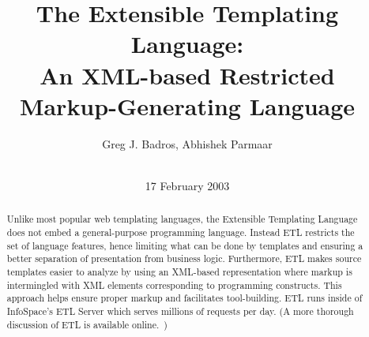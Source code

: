 \documentclass{www2003-submission}
\newcommand{\etl}{ETL}
\begin{document}
%
\title{The Extensible Templating Language: \\
       An XML-based Restricted Markup-Generating Language\vspace*{-.2in}}


\author{
%
\alignauthor Greg J. Badros, Abhishek Parmaar\\
       \\
       }

\date{17 February 2003}
\maketitle
\vspace*{-.7in}
\begin{abstract}
{ \small Unlike most popular web templating languages, the Extensible
Templating Language does not embed a general-purpose programming
language. Instead \etl{} restricts the set of language features, hence
limiting what can be done by templates and ensuring a better
separation of presentation from business logic. Furthermore,
\etl{} makes source templates easier to analyze by using an
XML-based representation where markup is intermingled with XML
elements corresponding to programming constructs. This approach helps
ensure proper markup and facilitates tool-building. \etl{} runs inside
of InfoSpace's ETL Server which serves millions of requests per
day. (A more thorough discussion of ETL is available
online.~\cite{ETL-full}) }


\end{abstract}



\end{document}

